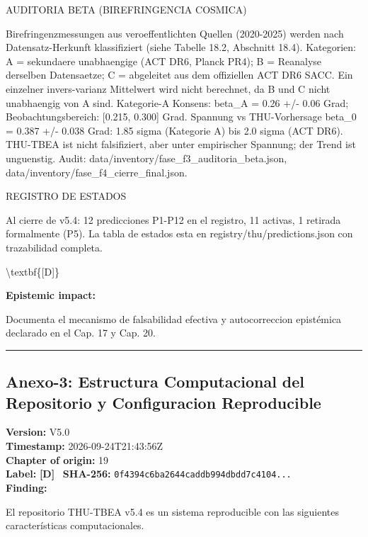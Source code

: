 ﻿\documentclass[11pt,letterpaper]{article}
\begin{document}
AUDITORIA BETA (BIREFRINGENCIA COSMICA)

Birefringenzmessungen aus veroeffentlichten Quellen (2020-2025) werden nach Datensatz-Herkunft klassifiziert (siehe Tabelle 18.2, Abschnitt 18.4). Kategorien: A = sekundaere unabhaengige (ACT DR6, Planck PR4); B = Reanalyse derselben Datensaetze; C = abgeleitet aus dem offiziellen ACT DR6 SACC. Ein einzelner invers-varianz Mittelwert wird nicht berechnet, da B und C nicht unabhaengig von A sind. Kategorie-A Konsens: beta_A = 0.26 +/- 0.06 Grad; Beobachtungsbereich: [0.215, 0.300] Grad. Spannung vs THU-Vorhersage beta_0 = 0.387 +/- 0.038 Grad: 1.85 sigma (Kategorie A) bis 2.0 sigma (ACT DR6). THU-TBEA ist nicht falsifiziert, aber unter empirischer Spannung; der Trend ist unguenstig. Audit: data/inventory/fase_f3_auditoria_beta.json, data/inventory/fase_f4_cierre_final.json.

REGISTRO DE ESTADOS

Al cierre de v5.4: 12 predicciones P1-P12 en el registro, 11 activas, 1 retirada formalmente (P5). La tabla de estados esta en registry/thu/predictions.json con trazabilidad completa.

\textbackslash{}textbf\{[D]\}

\textbf{Epistemic impact:}

Documenta el mecanismo de falsabilidad efectiva y autocorreccion epistémica declarado en el Cap. 17 y Cap. 20.

\vspace{1em}\hrule\vspace{1em}
\subsection*{Anexo-3: Estructura Computacional del Repositorio y Configuracion Reproducible}
\textbf{Version:} V5.0 \\
\textbf{Timestamp:} 2026-09-24T21:43:56Z \\
\textbf{Chapter of origin:} 19 \\
\textbf{Label:} \textcolor{Dgreen}{\textbf{[D]}} \
\textbf{SHA-256:} \texttt{0f4394c6ba2644caddb994dbdd7c4104...} \\[0.5em]
\textbf{Finding:}

El repositorio THU-TBEA v5.4 es un sistema reproducible con las siguientes características computacionales.
\end{document}
